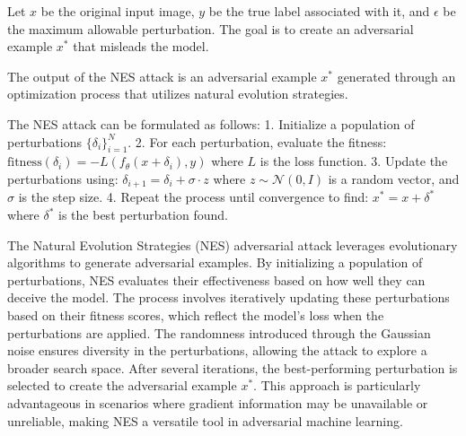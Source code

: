 Let $x$ be the original input image, $y$ be the true label associated with it, and $\epsilon$ be the maximum allowable perturbation. The goal is to create an adversarial example $x^*$ that misleads the model.

The output of the NES attack is an adversarial example $x^*$ generated through an optimization process that utilizes natural evolution strategies.

The NES attack can be formulated as follows:
1. Initialize a population of perturbations $\{\delta_i\}_{i=1}^N$.
2. For each perturbation, evaluate the fitness:
   $\text{fitness}(\delta_i) = -L(f_\theta(x + \delta_i), y)$
   where $L$ is the loss function.
3. Update the perturbations using:
   $\delta_{i+1} = \delta_i + \sigma \cdot z$
   where $z \sim \mathcal{N}(0, I)$ is a random vector, and $\sigma$ is the step size.
4. Repeat the process until convergence to find:
   $x^* = x + \delta^*$
   where $\delta^*$ is the best perturbation found.

The Natural Evolution Strategies (NES) adversarial attack leverages evolutionary algorithms to generate adversarial examples. By initializing a population of perturbations, NES evaluates their effectiveness based on how well they can deceive the model. The process involves iteratively updating these perturbations based on their fitness scores, which reflect the model's loss when the perturbations are applied. The randomness introduced through the Gaussian noise ensures diversity in the perturbations, allowing the attack to explore a broader search space. After several iterations, the best-performing perturbation is selected to create the adversarial example $x^*$. This approach is particularly advantageous in scenarios where gradient information may be unavailable or unreliable, making NES a versatile tool in adversarial machine learning.
